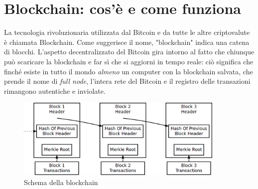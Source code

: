 \documentclass {article}
\begin{document}



\newpage


\section {Blockchain: cos'è e come funziona}


La tecnologia rivoluzionaria utilizzata dal Bitcoin e da tutte le altre criptovalute è chiamata Blockchain.
Come suggerisce il nome, "blockchain" indica una catena di blocchi.
L'aspetto decentralizzato del Bitcoin gira intorno al fatto che chiunque può scaricare la blockchain e far sì che si aggiorni in tempo reale: ciò significa che finché esiste in tutto il mondo \emph{almeno} un computer con la blockchain salvata, che prende il nome di \textit{full node}, l'intera rete del Bitcoin e il registro delle transazioni rimangono autentiche e inviolate.

\vspace {0.5cm}
\begin{figure}[htb!]
\includegraphics [width = 10cm] {blockchain2.png}
\centering
\caption {Schema della blockchain}
\end{figure}
\vspace {0.2cm}
\end{document}
